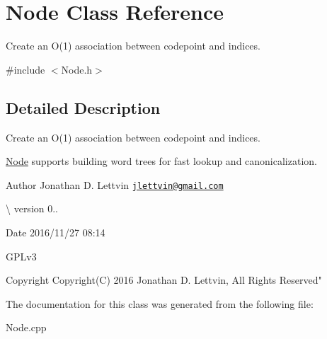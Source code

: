 \hypertarget{class_node}{}\section{Node Class Reference}
\label{class_node}


Create an O(1) association between codepoint and indices.  




{\ttfamily \#include $<$Node.\+h$>$}



\subsection{Detailed Description}
Create an O(1) association between codepoint and indices. 

\hyperlink{class_node}{Node} supports building word trees for fast lookup and canonicalization.

\begin{DoxyAuthor}{Author}
Jonathan D. Lettvin \href{mailto:jlettvin@gmail.com}{\tt jlettvin@gmail.\+com}
\end{DoxyAuthor}
\textbackslash{} version 0..

\begin{DoxyDate}{Date}
2016/11/27 08\+:14
\end{DoxyDate}
G\+P\+Lv3

\begin{DoxyCopyright}{Copyright}
Copyright(\+C) 2016 Jonathan D. Lettvin, All Rights Reserved" 
\end{DoxyCopyright}


The documentation for this class was generated from the following file\+:\begin{DoxyCompactItemize}
\item 
Node.\+cpp\end{DoxyCompactItemize}
